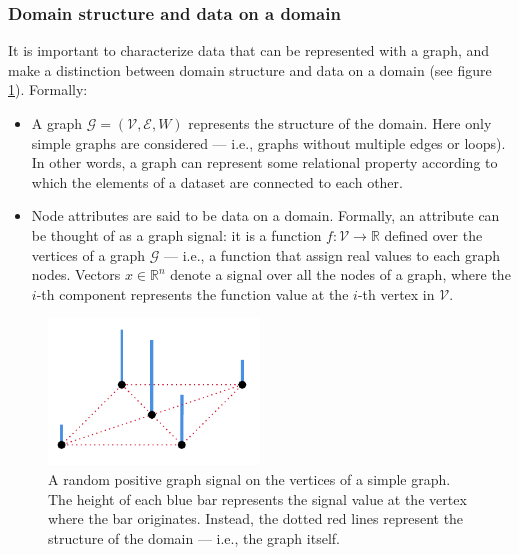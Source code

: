             \subsubsection{Domain structure and data on a domain}\label{domainstructure_datadomain}
                It is important to characterize data that can be represented with a graph, and make a distinction between domain structure and data on a domain (see figure \ref{data_on_domain}). Formally:
                \begin{itemize}
                    \item A graph \(\mathcal{G} = \left(\mathcal{V}, \mathcal{E}, W\right)\) represents the structure of the domain. Here only simple graphs are considered --- i.e., graphs without multiple edges or loops). In other words, a graph can represent some relational property according to which the elements of a dataset are connected to each other.
                    \item Node attributes are said to be data on a domain. Formally, an attribute can be thought of as a graph signal: it is a function \(f: \mathcal{V} \rightarrow \mathbb{R}\) defined over the vertices of a graph \(\mathcal{G}\) --- i.e., a function that assign real values to each graph nodes. Vectors \(x \in \mathbb{R}^n\) denote a signal over all the nodes of a graph, where the \(i\)-th component represents the function value at the \(i\)-th vertex in \(\mathcal{V}\).
                \end{itemize}
                
                \begin{figure}
                    \centering
                    \includegraphics[width=0.5\textwidth]{images/data_on_domain.pdf}
                    \caption{A random positive graph signal on the vertices of a simple graph. The height of each blue bar represents the signal value at the vertex where the bar originates. Instead, the dotted red lines represent the structure of the domain --- i.e., the graph itself.}
                    \label{data_on_domain}
                \end{figure}
            

